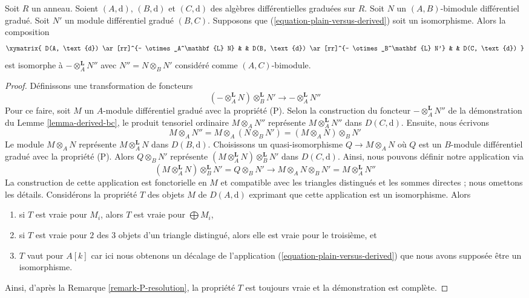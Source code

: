 \begin{lemma}
\label{lemma-compose-tensor-functors-general}
Soit $R$ un anneau. Soient $(A, \text{d})$, $(B, \text{d})$ et $(C, \text{d})$ des
algèbres différentielles graduées sur $R$. Soit $N$ un
$(A, B)$-bimodule différentiel gradué. Soit $N'$ un module différentiel gradué $(B, C)$. Supposons que
(\ref{equation-plain-versus-derived}) soit un isomorphisme. Alors la composition
$$
\xymatrix{
D(A, \text{d}) \ar[rr]^{- \otimes_A^\mathbf{L} N} & &
D(B, \text{d}) \ar[rr]^{- \otimes_B^\mathbf{L} N'} & &
D(C, \text{d})
}
$$
est isomorphe à $- \otimes_A^\mathbf{L} N''$ avec $N'' = N \otimes_B N'$ considéré
comme $(A, C)$-bimodule.
\end{lemma}

\begin{proof}
Définissons une transformation de foncteurs
$$
(- \otimes_A^\mathbf{L} N) \otimes_B^\mathbf{L} N'
\longrightarrow
- \otimes_A^\mathbf{L} N''
$$
Pour ce faire, soit $M$ un $A$-module différentiel gradué avec la propriété (P).
Selon la construction du foncteur $- \otimes_A^\mathbf{L} N''$ de la démonstration
du Lemme \ref{lemma-derived-bc}, le produit tensoriel ordinaire $M \otimes_A N''$
représente $M \otimes_A^\mathbf{L} N''$ dans $D(C, \text{d})$. Ensuite, nous
écrivons
$$
M \otimes_A N'' =
M \otimes_A (N \otimes_B N') =
(M \otimes_A N) \otimes_B N'
$$
Le module $M \otimes_A N$ représente $M \otimes_A^\mathbf{L} N$ dans $D(B,
\text{d})$. Choisissons un quasi-isomorphisme $Q \to M \otimes_A N$ où $Q$ est un
$B$-module différentiel gradué avec la propriété (P). Alors $Q \otimes_B N'$
représente $(M \otimes_A^\mathbf{L} N) \otimes_B^\mathbf{L} N'$ dans $D(C,
\text{d})$. Ainsi, nous pouvons définir notre application via
$$
(M \otimes_A^\mathbf{L} N) \otimes_B^\mathbf{L} N' =
Q \otimes_B N' \to
M \otimes_A N \otimes_B N' =
M \otimes_A^\mathbf{L} N''
$$
La construction de cette application est fonctorielle en $M$ et compatible avec
les triangles distingués et les sommes directes ; nous omettons les détails.
Considérons la propriété $T$ des objets $M$ de $D(A, \text{d})$ exprimant que
cette application est un isomorphisme. Alors
\begin{enumerate}
\item si $T$ est vraie pour $M_i$, alors $T$ est vraie pour $\bigoplus M_i$,
\item si $T$ est vraie pour $2$ des $3$ objets d'un triangle distingué, alors elle est vraie pour
le troisième, et
\item $T$ vaut pour $A[k]$ car ici nous obtenons un décalage de l'application
(\ref{equation-plain-versus-derived}) que nous avons supposée être un
isomorphisme.
\end{enumerate}
Ainsi, d'après la Remarque \ref{remark-P-resolution}, la propriété $T$ est toujours
vraie et la démonstration est complète.
\end{proof}

